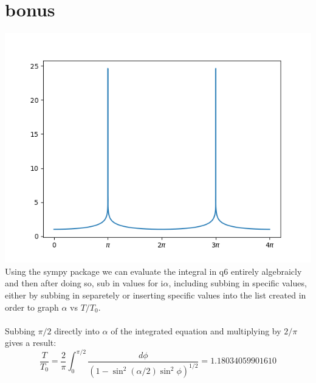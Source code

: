 \documentclass[a4paper,english]{article}
\begin{document}
    \section{bonus}
    
    \includegraphics[scale=0.8]{./q4_bonus.png}
    Using the sympy package we can evaluate the integral in q6 entirely algebraicly and 
    then after doing so, sub in values for i$\alpha$, including subbing in specific values,
    either by subbing in separetely or inserting specific values into the list created 
    in order to graph $\alpha$ vs $T/T_0$.
    \\
    \\
    Subbing $\pi/2$ directly into $\alpha$ of the integrated equation and multiplying by $2/\pi$ 
    gives a result:
    \begin{equation}
        \frac{T}{T_0} = \frac{2}{\pi}\int_0^{\pi/2}\frac{d\phi}{(1-\sin^2(\alpha/2)\sin^2\phi)^{1/2}} 
        = 1.18034059901610
    \end{equation}
\end{document}
